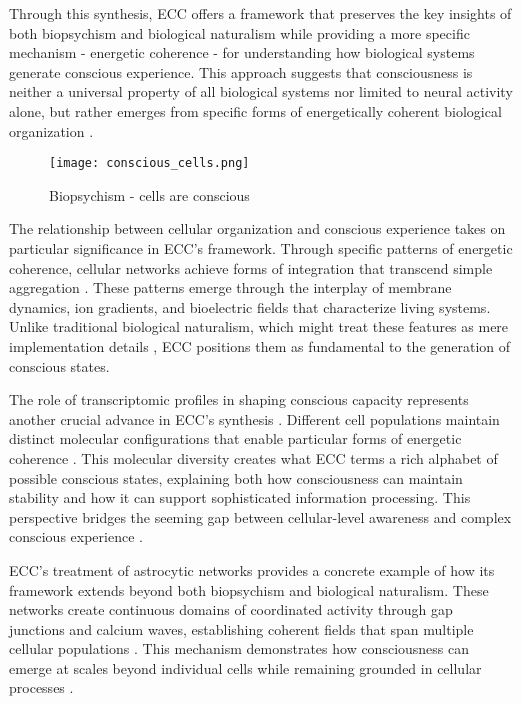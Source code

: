 \begin{refsection}
Through this synthesis, ECC offers a framework that preserves the key insights of both biopsychism and biological naturalism while providing a more specific mechanism - energetic coherence - for understanding how biological systems generate conscious experience. This approach suggests that consciousness is neither a universal property of all biological systems nor limited to neural activity alone, but rather emerges from specific forms of energetically coherent biological organization \cite{clark2010supersizing}.

\begin{figure}[h]
    \centering
    \texttt{[image: conscious\_cells.png]}

    \caption{Biopsychism - cells are conscious}
\end{figure}

The relationship between cellular organization and conscious experience takes on particular significance in ECC's framework. Through specific patterns of energetic coherence, cellular networks achieve forms of integration that transcend simple aggregation \cite{lyon2015cognitive}. These patterns emerge through the interplay of membrane dynamics, ion gradients, and bioelectric fields that characterize living systems. Unlike traditional biological naturalism, which might treat these features as mere implementation details \cite{searle2017biological}, ECC positions them as fundamental to the generation of conscious states.

The role of transcriptomic profiles in shaping conscious capacity represents another crucial advance in ECC's synthesis \cite{Tasic2018,Hawrylycz2012}. Different cell populations maintain distinct molecular configurations that enable particular forms of energetic coherence \cite{shapiro2007bacteria}. This molecular diversity creates what ECC terms a rich alphabet of possible conscious states, explaining both how consciousness can maintain stability and how it can support sophisticated information processing. This perspective bridges the seeming gap between cellular-level awareness and complex conscious experience \cite{van2006principles}.

ECC's treatment of astrocytic networks provides a concrete example of how its framework extends beyond both biopsychism and biological naturalism. These networks create continuous domains of coordinated activity through gap junctions and calcium waves, establishing coherent fields that span multiple cellular populations \cite{edwards2005consciousness}. This mechanism demonstrates how consciousness can emerge at scales beyond individual cells while remaining grounded in cellular processes \cite{thompson2010mind}.


\end{refsection}

